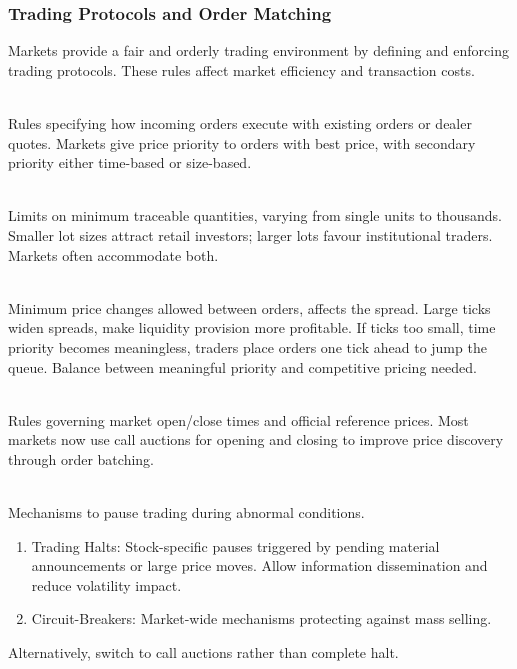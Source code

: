 \subsubsection{Trading Protocols and Order Matching}

Markets provide a fair and orderly trading environment by defining and enforcing trading protocols. These rules affect market efficiency and transaction costs.

\begin{definition} \\
Rules specifying how incoming orders execute with existing orders or dealer quotes. Markets give price priority to orders with best price, with secondary priority either time-based or size-based.
\end{definition}

\begin{definition} \\
Limits on minimum traceable quantities, varying from single units to thousands. Smaller lot sizes attract retail investors; larger lots favour institutional traders. Markets often accommodate both.
\end{definition}

\begin{definition} \\
Minimum price changes allowed between orders, affects the spread. Large ticks widen spreads, make liquidity provision more profitable. If ticks too small, time priority becomes meaningless, traders place orders one tick ahead to jump the queue. Balance between meaningful priority and competitive pricing needed.
\end{definition}

\begin{definition} \\
Rules governing market open/close times and official reference prices. Most markets now use call auctions for opening and closing to improve price discovery through order batching.
\end{definition}

\begin{definition} \\
Mechanisms to pause trading during abnormal conditions.
\begin{enumerate}[label=\roman*.]
\setlength{\itemsep}{0pt}
\item Trading Halts: Stock-specific pauses triggered by pending material announcements or large price moves. Allow information dissemination and reduce volatility impact.
\item Circuit-Breakers: Market-wide mechanisms protecting against mass selling.
\end{enumerate}
Alternatively, switch to call auctions rather than complete halt.
\end{definition}

